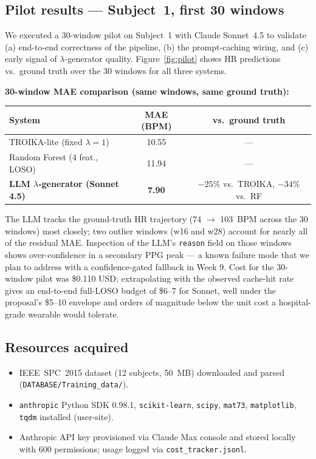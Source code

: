 \documentclass[sigconf,nonacm,balance]{acmart}
\begin{document}
\subsection{Pilot results --- Subject~1, first 30 windows}
We executed a 30-window pilot on Subject~1 with Claude Sonnet~4.5 to validate (a) end-to-end correctness of the pipeline, (b) the prompt-caching wiring, and (c) early signal of $\lambda$-generator quality. Figure~\ref{fig:pilot} shows HR predictions vs.\ ground truth over the 30 windows for all three systems.

\textbf{30-window MAE comparison (same windows, same ground truth):}

\begin{table}[h]
\centering
\small
\begin{tabular}{lcc}
\toprule
System & MAE (BPM) & vs.\ ground truth \\
\midrule
TROIKA-lite (fixed $\lambda{=}1$) & 10.55 & --- \\
Random Forest (4 feat., LOSO) & 11.94 & --- \\
\textbf{LLM $\lambda$-generator (Sonnet 4.5)} & \textbf{7.90} & $-25\%$ vs.\ TROIKA, $-34\%$ vs.\ RF \\
\bottomrule
\end{tabular}
\end{table}

\noindent The LLM tracks the ground-truth HR trajectory (74 $\rightarrow$ 103~BPM across the 30 windows) most closely; two outlier windows (w16 and w28) account for nearly all of the residual MAE. Inspection of the LLM's \texttt{reason} field on those windows shows over-confidence in a secondary PPG peak --- a known failure mode that we plan to address with a confidence-gated fallback in Week 9. Cost for the 30-window pilot was \$0.110 USD; extrapolating with the observed cache-hit rate gives an end-to-end full-LOSO budget of \$6--7 for Sonnet, well under the proposal's \$5--10 envelope and orders of magnitude below the unit cost a hospital-grade wearable would tolerate.

\subsection{Resources acquired}
\begin{itemize}\setlength\itemsep{0.0em}
  \item IEEE~SPC~2015 dataset (12 subjects, 50~MB) downloaded and parsed (\texttt{DATABASE/Training\_data/}).
  \item \texttt{anthropic} Python SDK 0.98.1, \texttt{scikit-learn}, \texttt{scipy}, \texttt{mat73}, \texttt{matplotlib}, \texttt{tqdm} installed (user-site).
  \item Anthropic API key provisioned via Claude Max console and stored locally with 600 permissions; usage logged via \texttt{cost\_tracker.jsonl}.
\end{itemize}
\end{document}
